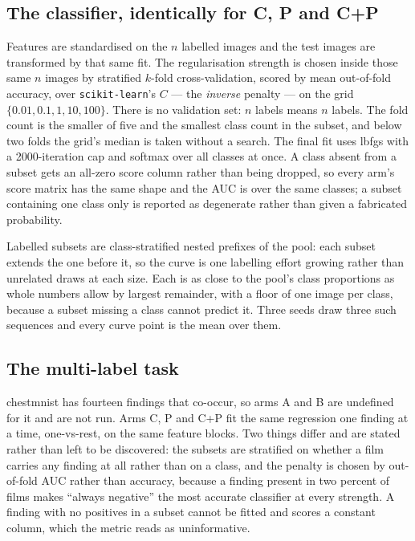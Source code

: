 \documentclass[11pt]{article}
\begin{document}
\subsection{The classifier, identically for C, P and C+P}

Features are standardised on the $n$ labelled images and the test images are transformed by that
same fit. The regularisation strength is chosen inside those same $n$ images by stratified
$k$-fold cross-validation, scored by mean out-of-fold accuracy, over
\texttt{scikit-learn}'s $C$ --- the \emph{inverse} penalty --- on the grid
$\{0.01, 0.1, 1, 10, 100\}$. There is no validation set: $n$ labels means $n$ labels. The fold
count is the smaller of five and the smallest class count in the subset, and below two folds the
grid's median is taken without a search. The final fit uses lbfgs with a 2000-iteration cap and
softmax over all classes at once. A class absent from a subset gets an all-zero score column rather
than being dropped, so every arm's score matrix has the same shape and the AUC is over the same
classes; a subset containing one class only is reported as degenerate rather than given a fabricated
probability.

Labelled subsets are class-stratified nested prefixes of the pool: each subset extends the one
before it, so the curve is one labelling effort growing rather than unrelated draws at each size. Each is as
close to the pool's class proportions as whole numbers allow by largest remainder, with a floor of
one image per class, because a subset missing a class cannot predict it. Three seeds draw three
such sequences and every curve point is the mean over them.

\subsection{The multi-label task}

chestmnist has fourteen findings that co-occur, so arms A and B are undefined for it and are not
run. Arms C, P and C+P fit the same regression one finding at a time, one-vs-rest, on the same
feature blocks. Two things differ and are stated rather than left to be discovered: the subsets are
stratified on whether a film carries any finding at all rather than on a class, and the penalty is
chosen by out-of-fold AUC rather than accuracy, because a finding present in two percent of films
makes ``always negative'' the most accurate classifier at every strength. A finding with no
positives in a subset cannot be fitted and scores a constant column, which the metric reads as
uninformative.
\end{document}

